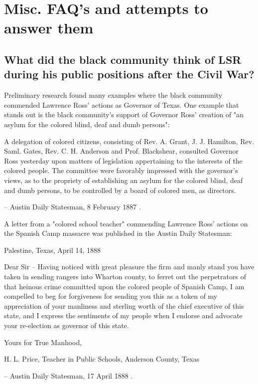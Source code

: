 \documentclass[12pt]{article}
\begin{document}
\section{Misc. FAQ's and attempts to answer them}

\subsection{What did the black community think of LSR during his public positions after the Civil War?}
Preliminary research found many examples where the black community commended Lawrence Ross' actions as Governor of Texas. One example that stands out is the black community's support of Governor Ross' creation of "an asylum for the colored blind, deaf and dumb persons":

\begin{displayquote}
A delegation of colored citizens, consisting of Rev. A. Grant, J. J. Hamilton, Rev. Saml. Gates, Rev. C. H. Anderson and Prof. Blackshear, consulted Governor Ross yesterday upon matters of legislation appertaining to the interests of the colored people. The committee were favorably impressed with the governor’s views, as to the propriety of establishing an asylum for the colored blind, deaf and dumb persons, to be controlled by a board of colored men, as directors.

-- Austin Daily Statesman, 8 February 1887 \cite{astatesman:1887-02-08}.
\end{displayquote}

A letter from a "colored school teacher" commending Lawrence Ross' actions on the Spanish Camp massacre was published in the Austin Daily Statesman: 
\begin{displayquote}
Palestine, Texas, April 14, 1888

Dear Sir – Having noticed with great pleasure the firm and manly stand you have taken in sending rangers into Wharton county, to ferret out the perpetrators of that heinous crime committed upon the colored people of Spanish Camp, I am compelled to beg for forgiveness for sending you this as a token of my appreciation of your manliness and sterling worth of the chief executive of this state, and I express the sentiments of my people when I endorse and advocate your re-election as governor of this state.

Yours for True Manhood,

H. L. Price,
Teacher in Public Schools, Anderson County, Texas

-- Austin Daily Statesman, 17 April 1888 \cite{astatesman:1888-04-17}.
\end{displayquote}
\end{document}
